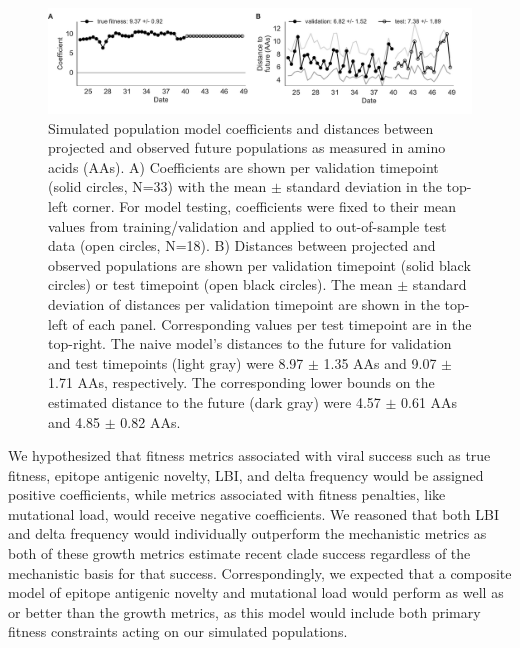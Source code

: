 \begin{figure}[htb]
  \begin{center}
  \includegraphics[width=\textwidth]{figures/unadjusted-model-accuracy-and-coefficients-for-simulated-populations-controls.pdf}
  \caption{
    Simulated population model coefficients and distances between projected and observed future populations as measured in amino acids (AAs).
    A) Coefficients are shown per validation timepoint (solid circles, N=33) with the mean $\pm$ standard deviation in the top-left corner.
    For model testing, coefficients were fixed to their mean values from training/validation and applied to out-of-sample test data (open circles, N=18).
    B) Distances between projected and observed populations are shown per validation timepoint (solid black circles) or test timepoint (open black circles).
    The mean $\pm$ standard deviation of distances per validation timepoint are shown in the top-left of each panel.
    Corresponding values per test timepoint are in the top-right.
    The naive model's distances to the future for validation and test timepoints (light gray) were 8.97 $\pm$ 1.35 AAs and 9.07 $\pm$ 1.71 AAs, respectively.
    The corresponding lower bounds on the estimated distance to the future (dark gray) were 4.57 $\pm$ 0.61 AAs and 4.85 $\pm$ 0.82 AAs.
  }
  \label{fig:unadjusted_model_accuracy_and_coefficients_for_simulated_populations_controls}
  \end{center}
\end{figure}

We hypothesized that fitness metrics associated with viral success such as true fitness, epitope antigenic novelty, LBI, and delta frequency would be assigned positive coefficients, while metrics associated with fitness penalties, like mutational load, would receive negative coefficients.
We reasoned that both LBI and delta frequency would individually outperform the mechanistic metrics as both of these growth metrics estimate recent clade success regardless of the mechanistic basis for that success.
Correspondingly, we expected that a composite model of epitope antigenic novelty and mutational load would perform as well as or better than the growth metrics, as this model would include both primary fitness constraints acting on our simulated populations.

